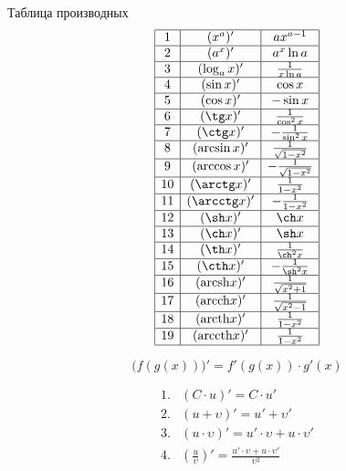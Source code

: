 \documentclass{article}
\newcommand{\arcsh}{\mathrm{arcsh}}
\newcommand{\arcch}{\mathrm{arcch}}
\newcommand{\arcth}{\mathrm{arcth}}
\newcommand{\arccth}{\mathrm{arccth}}
\begin{document}
{\large Таблица производных}
\begin{displaymath}
\begin{array}{|c|c|c|}

  \hline
  1 &		(x^{a})'		    &	ax^{a-1}\\
  \hline
  2 &		(a^{x})'		    &	a^{x}\ln a\\
  \hline
  3 &		(\log_{a}x)'	  &	\frac{1}{x\ln a}\\
  \hline
  4 &		(\sin x)'			  &	\cos x\\
  \hline
  5 &		(\cos x)'		    &	-\sin x\\
  \hline
  6 &		(\tg x)'			  &	\frac{1}{\cos^{2} x}\\
  \hline
  7 & 	(\ctg x)'		    &	-\frac{1}{\sin^{2} x}\\
  \hline
  8 &		(\arcsin x)'		&	\frac{1}{\sqrt{1-x^{2}}}\\
  \hline
  9 &		(\arccos x)'		&	-\frac{1}{\sqrt{1-x^{2}}}\\
  \hline
  10&	(\arctg x)'		    &	\frac{1}{1-x^{2}}\\
  \hline
  11&	(\arcctg x)'		  &	-\frac{1}{1-x^{2}}\\
  \hline
  12&	(\sh x)'			    &	\ch x\\
  \hline
  13&	(\ch x)'			    &	\sh x\\
  \hline
  14&	(\th x)' 			    &	\frac{1}{\ch^{2} x}\\
  \hline
  15&	(\cth x)'		      &	-\frac{1}{\sh^{2} x}\\
  \hline
  16&	(\arcsh x)'		    &	\frac{1}{\sqrt{x^{2}+1}}\\
  \hline
  17&	(\arcch x)'		    &	\frac{1}{\sqrt{x^{2}-1}}\\
  \hline
  18&	(\arcth x)'		    &	\frac{1}{1-x^{2}}\\
  \hline
  19&	(\arccth x)'		  &	\frac{1}{1-x^{2}}\\
  \hline

\end{array}
\end{displaymath}

\[   \Big(f(g(x))\Big) ' = f'(g(x)) \cdot g'(x)  \]

\begin{displaymath}
\begin{array}{cl}

  1.&  (C\cdot u)'                         =   C\cdot u'\\
  2.&  \left(u + \upsilon       \right)'   =   u' + \upsilon'\\
  3.&  \left(u\cdot \upsilon    \right)'   =   u'\cdot\upsilon + u\cdot\upsilon' \\
  4.&  \left(\frac{u}{\upsilon} \right)'   =   \frac{u'\cdot\upsilon + u\cdot\upsilon'}{\upsilon^2}\\

\end{array}
\end{displaymath}
\end{document}
